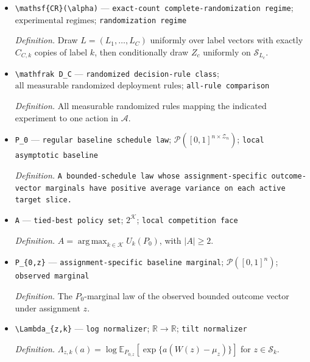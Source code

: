 \documentclass{article}
\begin{document}
\begin{itemize}
  \par\smallskip\noindent\emph{Definition.} \(\alpha_k=\lim_{C\to\infty}C_{C,k}/C\), whenever the displayed limit is invoked.
  \item \texttt{\textbackslash{}\allowbreak{}mathsf\{CR\}\allowbreak{}(\textbackslash{}\allowbreak{}alpha)} --- \texttt{exact-\allowbreak{}count complete-\allowbreak{}randomization regime}; \(\text{experimental regimes}\); \texttt{randomization regime}
  \par\smallskip\noindent\emph{Definition.} Draw \(L=(L_1,\ldots,L_C)\) uniformly over label vectors with exactly \(C_{C,k}\) copies of label \(k\), then conditionally draw \(Z_c\) uniformly on \(\mathcal S_{L_c}\).
  \item \texttt{\textbackslash{}\allowbreak{}mathfrak D\_\allowbreak{}C} --- \texttt{randomized decision-\allowbreak{}rule class}; \(\text{all measurable randomized deployment rules}\); \texttt{all-\allowbreak{}rule comparison}
  \par\smallskip\noindent\emph{Definition.} All measurable randomized rules mapping the indicated experiment to one action in \(\mathcal A\).
  \item \texttt{P\_\allowbreak{}0} --- \texttt{regular baseline schedule law}; \(\mathcal P([0,1]^{n\times\mathcal Z_n})\); \texttt{local asymptotic baseline}
  \par\smallskip\noindent\emph{Definition.} \texttt{A bounded-\allowbreak{}schedule law whose assignment-\allowbreak{}specific outcome-\allowbreak{}vector marginals have positive average variance on each active target slice.}
  \item \texttt{A} --- \texttt{tied-\allowbreak{}best policy set}; \(2^{\mathcal K}\); \texttt{local competition face}
  \par\smallskip\noindent\emph{Definition.} \(A=\operatorname*{arg\,max}_{k\in\mathcal K}U_k(P_0)\), with \(|A|\geq2\).
  \item \texttt{P\_\allowbreak{}\{0,\allowbreak{}z\}\allowbreak{}} --- \texttt{assignment-\allowbreak{}specific baseline marginal}; \(\mathcal P([0,1]^n)\); \texttt{observed marginal}
  \par\smallskip\noindent\emph{Definition.} The \(P_0\)-marginal law of the observed bounded outcome vector under assignment \(z\).
  \item \texttt{\textbackslash{}\allowbreak{}Lambda\_\allowbreak{}\{z,\allowbreak{}k\}\allowbreak{}} --- \texttt{log normalizer}; \(\mathbb R\to\mathbb R\); \texttt{tilt normalizer}
  \par\smallskip\noindent\emph{Definition.} \(\Lambda_{z,k}(a)=\log\mathbb E_{P_{0,z}}[\exp\{a(W(z)-\mu_z)\}]\) for \(z\in\mathcal S_k\).

\end{itemize}
\end{document}
